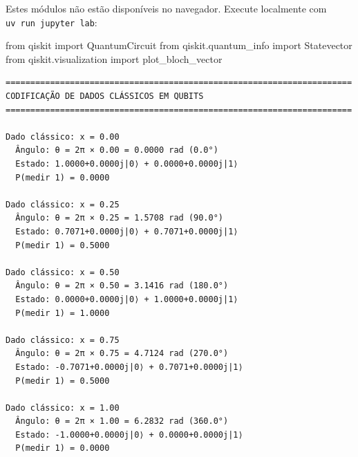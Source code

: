 \documentclass[
  brazilian,
]{report}
\newenvironment{Shaded}{\begin{snugshade}}{\end{snugshade}}
\newcommand{\ImportTok}[1]{\textcolor[rgb]{0.00,0.46,0.62}{#1}}
\newcommand{\NormalTok}[1]{\textcolor[rgb]{0.00,0.23,0.31}{#1}}
\begin{document}
\begin{tcolorbox}[enhanced jigsaw, arc=.35mm, bottomrule=.15mm, bottomtitle=1mm, breakable, colback=white, colbacktitle=quarto-callout-note-color!10!white, colframe=quarto-callout-note-color-frame, coltitle=black, left=2mm, leftrule=.75mm, opacityback=0, opacitybacktitle=0.6, rightrule=.15mm, title=\textcolor{quarto-callout-note-color}{\faInfo}\hspace{0.5em}{🔒 Imports do Qiskit (requerem execução local)}, titlerule=0mm, toprule=.15mm, toptitle=1mm]

Estes módulos não estão disponíveis no navegador. Execute localmente com
\texttt{uv\ run\ jupyter\ lab}:

\begin{Shaded}
\begin{Highlighting}[]
\ImportTok{from}\NormalTok{ qiskit }\ImportTok{import}\NormalTok{ QuantumCircuit}
\ImportTok{from}\NormalTok{ qiskit.quantum\_info }\ImportTok{import}\NormalTok{ Statevector}
\ImportTok{from}\NormalTok{ qiskit.visualization }\ImportTok{import}\NormalTok{ plot\_bloch\_vector}
\end{Highlighting}
\end{Shaded}

\end{tcolorbox}

\begin{verbatim}
======================================================================
CODIFICAÇÃO DE DADOS CLÁSSICOS EM QUBITS
======================================================================

Dado clássico: x = 0.00
  Ângulo: θ = 2π × 0.00 = 0.0000 rad (0.0°)
  Estado: 1.0000+0.0000j|0⟩ + 0.0000+0.0000j|1⟩
  P(medir 1) = 0.0000

Dado clássico: x = 0.25
  Ângulo: θ = 2π × 0.25 = 1.5708 rad (90.0°)
  Estado: 0.7071+0.0000j|0⟩ + 0.7071+0.0000j|1⟩
  P(medir 1) = 0.5000

Dado clássico: x = 0.50
  Ângulo: θ = 2π × 0.50 = 3.1416 rad (180.0°)
  Estado: 0.0000+0.0000j|0⟩ + 1.0000+0.0000j|1⟩
  P(medir 1) = 1.0000

Dado clássico: x = 0.75
  Ângulo: θ = 2π × 0.75 = 4.7124 rad (270.0°)
  Estado: -0.7071+0.0000j|0⟩ + 0.7071+0.0000j|1⟩
  P(medir 1) = 0.5000

Dado clássico: x = 1.00
  Ângulo: θ = 2π × 1.00 = 6.2832 rad (360.0°)
  Estado: -1.0000+0.0000j|0⟩ + 0.0000+0.0000j|1⟩
  P(medir 1) = 0.0000
\end{verbatim}
\end{document}
